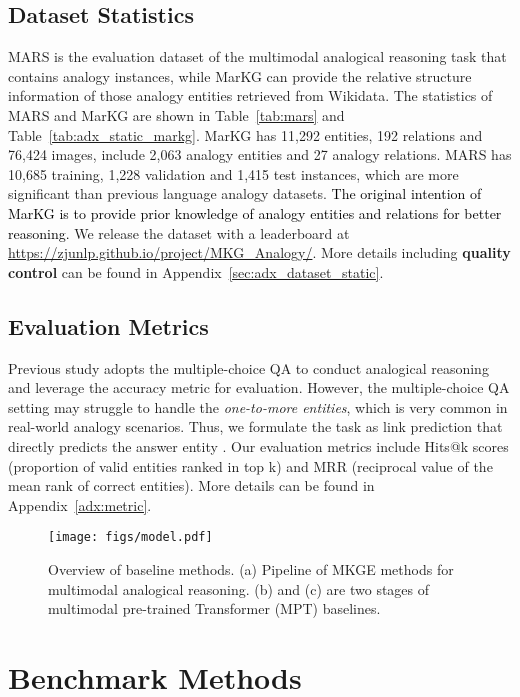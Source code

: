 \documentclass{article} \usepackage{iclr2023_conference,times}
\newcommand{\data}{MARS}
\newcommand{\kg}{MarKG}
\begin{document}
\subsection{Dataset Statistics}
{\data} is the evaluation dataset of the multimodal analogical reasoning task that contains analogy instances, while {\kg} can provide the relative structure information of those analogy entities retrieved from Wikidata.
The statistics of {\data} and  {\kg}  are shown in Table~\ref{tab:mars}
and Table~\ref{tab:adx_static_markg}. 
{\kg} has 11,292 entities, 192 relations and 76,424 images,  include 2,063 analogy entities and 27 analogy relations. 
{\data} has 10,685 training, 1,228 validation and 1,415 test instances, which are more significant than previous language analogy datasets. \textcolor{black}{The original intention of MarKG is to provide prior knowledge of analogy entities and relations for better reasoning.}
We release the dataset with a leaderboard at \url{https://zjunlp.github.io/project/MKG_Analogy/}.
More details including \textbf{quality control} can be found in Appendix~\ref{sec:adx_dataset_static}.


\subsection{Evaluation Metrics}
Previous study \citep{E-KAR} adopts the multiple-choice QA to conduct analogical reasoning and leverage the accuracy metric for evaluation. 
However, the multiple-choice QA setting may struggle to handle the \emph{one-to-more entities},
which is very common in real-world analogy scenarios.
Thus, we formulate the task as link prediction that directly predicts the answer entity .
Our evaluation metrics include Hits@k scores (proportion of valid entities ranked in top k) and MRR (reciprocal value of the mean rank of correct entities). 
More details  can be found in Appendix~\ref{adx:metric}.

\begin{figure}[!t]
\centering
\texttt{[image: figs/model.pdf]}
\caption{
Overview of baseline methods. 
(a) Pipeline of MKGE methods for multimodal analogical reasoning. 
(b) and (c) are two stages of multimodal pre-trained Transformer (MPT) baselines.}
\label{fig:model}
\end{figure}


\section{Benchmark Methods}
\end{document}
